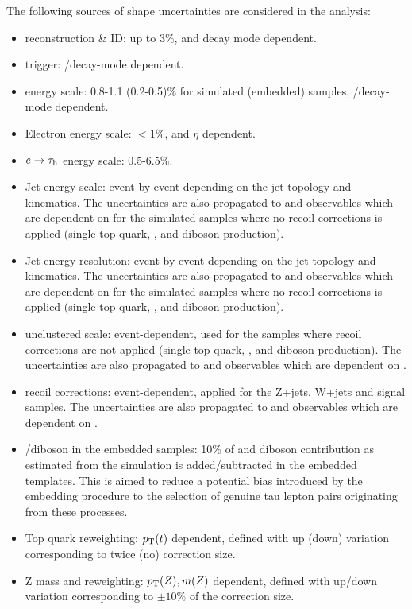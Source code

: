 The following sources of shape uncertainties are considered in the analysis:
\begin{itemize}
    \item \tauh reconstruction \& ID: up to 3\%, \pt and decay mode dependent.
    \item \tauh trigger: \pt/decay-mode dependent.
    \item \tauh energy scale: 0.8-1.1 (0.2-0.5)\% for simulated (embedded) samples, \pt/decay-mode dependent.
    \item Electron energy scale: $<1\%$, \pt and $\eta$ dependent.
    \item $e\to \tau_\mathrm{h}$ energy scale: 0.5-6.5\%.
    \item Jet energy scale: event-by-event depending on the jet topology and kinematics. The uncertainties are also propagated to \met and observables which are dependent on \met for the simulated samples where no recoil corrections is applied (single top quark, \ttbar, and diboson production). 
    \item Jet energy resolution: event-by-event depending on the jet topology and kinematics. The uncertainties are also propagated to \met and observables which are dependent on \met for the simulated samples where no recoil corrections is applied (single top quark, \ttbar, and diboson production).
    \item \met unclustered scale: event-dependent, used for the samples where recoil corrections are not applied (single top quark, \ttbar, and diboson production). The uncertainties are also propagated to \met and observables which are dependent on \met.
    \item \met recoil corrections: event-dependent, applied for the Z+jets, W+jets and signal samples. The uncertainties are also propagated to \met and observables which are dependent on \met.
    \item \ttbar/diboson in the embedded samples: 10\% of \ttbar and diboson contribution as estimated from the simulation is added/subtracted in the embedded templates. This is aimed to reduce a potential bias introduced by the embedding procedure to the selection of genuine tau lepton pairs originating from these processes.
    \item Top quark \pt reweighting: $p_{\text{T}}(t)$ dependent, defined with up (down) variation corresponding to twice (no) correction size.
    \item Z mass and \pt reweighting: $p_{\text{T}}(Z), m(Z)$ dependent, defined with up/down variation corresponding to $\pm10\%$ of the correction size.

\end{itemize}
